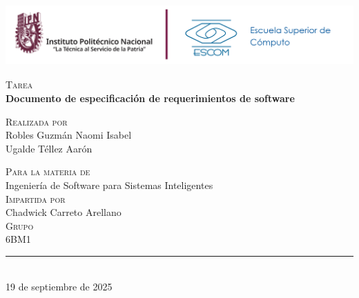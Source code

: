 \begin{titlepage}
  \thispagestyle{empty}
  \pagecolor{white}
  
  \begin{center}
    \vspace{1cm}
    
   
      \centering
          \vspace{2cm}
      \includegraphics[height=2.35cm]{img/logos.png}
    
    \vspace{3cm}
    
    {\normalsize\color{charcoal}\textsc{Tarea}}\\[0.5cm]
    
    {\huge\bfseries\color{black}Documento de especificación de requerimientos de software}\\[0.5cm]

    
    \vspace{1.5cm}
    
    {\small\color{charcoal}\textsc{Realizada por}}\\[0.3cm]
    
    {\normalsize\color{black}Robles Guzmán Naomi Isabel}\\[0.2cm]
    {\normalsize\color{black}Ugalde Téllez Aarón}\\[0.5cm]

    
    \vspace{0.8cm}
    
    {\small\color{charcoal}\textsc{Para la materia de}}\\[0.2cm]
    {\normalsize\color{blue}Ingeniería de Software para Sistemas Inteligentes}\\[0.5cm]
    
    {\small\color{charcoal}\textsc{Impartida por}}\\[0.2cm]
    {\normalsize\color{black}Chadwick Carreto Arellano}\\[0.5cm]
    
    {\small \color{charcoal}\textsc{Grupo}}\\[0.3cm]
    {\normalsize\color{black}6BM1}\\[0.8cm]
    
    \vfill
    
    {\color{blue}\rule{0.4\textwidth}{1pt}}\\[0.3cm]
    {\large\color{charcoal}19 de septiembre de 2025}
    
    \vspace{1cm}
    
  \end{center}
\end{titlepage}